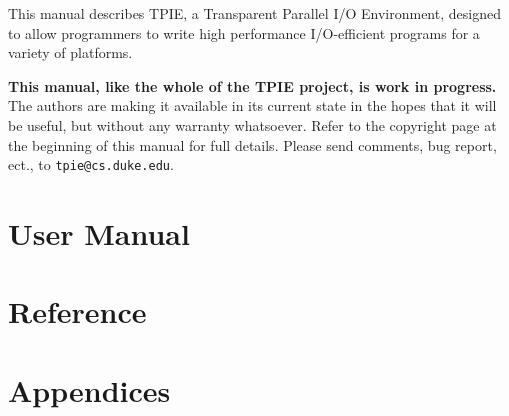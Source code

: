 This manual describes TPIE, a Transparent Parallel I/O Environment,
designed to allow programmers to write high performance I/O-efficient
programs for a variety of platforms.

{\bf This manual, like the whole of the TPIE project, is work in
  progress.} The authors are making it available in its current state
  in the hopes that it will be useful, but without any warranty
  whatsoever. Refer to the copyright page at the beginning of this
  manual for full details. Please send comments, bug report, ect., to
  \verb|tpie@cs.duke.edu|.


\part{User Manual}
  

\part{Reference}
\part{Appendices}
\appendix
  
  
   


\printindex



